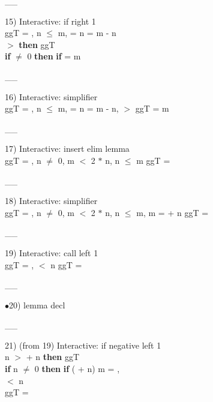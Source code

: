\documentclass[a4paper]{article}
\begin{document}
\vspace{-1.5ex}\_\hrulefill \_

15) Interactive: if right  1\\
\tabf \Do ggT\Dc {} = , n $\le$ m,  = n \And {} = m - n \\
\Fol {}  $>$  {\bf then} ggT \\
 \tabf {} {\bf if}  $\neq$ 0 {\bf then} {\bf if}  %
{} = m

\vspace{-1.5ex}\_\hrulefill \_

16) Interactive: simplifier \\
\Do ggT\Dc {} = , n $\le$ m,  = n \And {} = m - n,  $>$  \Fol \Do ggT\Dc {} = m

\vspace{-1.5ex}\_\hrulefill \_

17) Interactive: insert elim lemma \\
\Do ggT\Dc {} = , n $\neq$ 0, m $<$ 2 $*$ n, n $\le$ m \Fol \Do ggT\Dc {} = 

\vspace{-1.5ex}\_\hrulefill \_

18) Interactive: simplifier \\
\Do ggT\Dc {} = , n $\neq$ 0, m $<$ 2 $*$ n, n $\le$ m, m =  + n \Fol \Do ggT\Dc {} = 

\vspace{-1.5ex}\_\hrulefill \_

19) Interactive: call left  1\\
\Do ggT\Dc {} = ,  $<$ n \Fol \Do ggT\Dc {} = 

\vspace{-1.5ex}\_\hrulefill \_

$\bullet$20) lemma decl \\
 \Fol 

\vspace{-1.5ex}\_\hrulefill \_

21)  (from 19) Interactive: if negative left  1\\
\tabf {} n $>$  + n {\bf then} ggT \\
 \tabf {} {\bf if} n $\neq$ 0 {\bf then} {\bf if} ( + n) %
m = , \\
 \tabf {} $<$ n \\
\Fol \Do ggT\Dc {} = 
\end{document}
